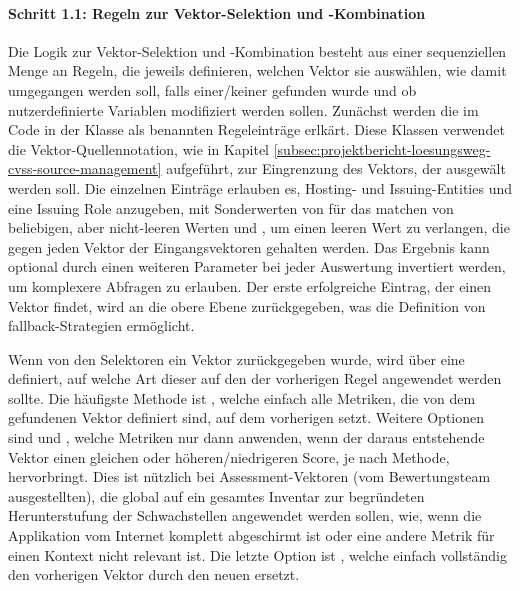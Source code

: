 \paragraph{Schritt 1.1: Regeln zur Vektor-Selektion und -Kombination} \label{par:projektbericht-loesungsweg-cvss-selection-rules-1-1}

Die Logik zur Vektor-Selektion und -Kombination besteht aus einer sequenziellen Menge an Regeln, die jeweils definieren, welchen Vektor sie auswählen, wie damit umgegangen werden soll, falls einer/keiner gefunden wurde und ob nutzerdefinierte Variablen modifiziert werden sollen.
Zunächst werden die im Code in der Klasse  als  benannten Regeleinträge erlkärt.
Diese Klassen verwendet die Vektor-Quellennotation, wie in Kapitel \ref{subsec:projektbericht-loesungsweg-cvss-source-management} aufgeführt, zur Eingrenzung des Vektors, der ausgewält werden soll.
Die einzelnen Einträge erlauben es, Hosting- und Issuing-Entities und eine Issuing Role anzugeben, mit Sonderwerten von \qt{*} für das matchen von beliebigen, aber nicht-leeren Werten und , um einen leeren Wert zu verlangen, die gegen jeden Vektor der Eingangsvektoren gehalten werden.
Das Ergebnis kann optional durch einen weiteren Parameter bei jeder Auswertung invertiert werden, um komplexere Abfragen zu erlauben.
Der erste erfolgreiche Eintrag, der einen Vektor findet, wird an die obere Ebene zurückgegeben, was die Definition von fallback-Strategien ermöglicht.


Wenn von den Selektoren ein Vektor zurückgegeben wurde, wird über eine  definiert, auf welche Art dieser auf den der vorherigen Regel angewendet werden sollte.
Die häufigste Methode ist , welche einfach alle Metriken, die von dem gefundenen Vektor definiert sind, auf dem vorherigen setzt.
Weitere Optionen sind  und , welche Metriken nur dann anwenden, wenn der daraus entstehende Vektor einen gleichen oder höheren/niedrigeren Score, je nach Methode, hervorbringt.
Dies ist nützlich bei Assessment-Vektoren (vom Bewertungsteam ausgestellten), die global auf ein gesamtes Inventar zur begründeten Herunterstufung der Schwachstellen angewendet werden sollen, wie, wenn die Applikation vom Internet komplett abgeschirmt ist oder eine andere Metrik für einen Kontext nicht relevant ist.
Die letzte Option ist , welche einfach vollständig den vorherigen Vektor durch den neuen ersetzt.

